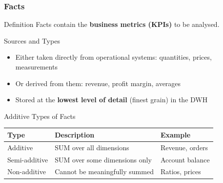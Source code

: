 \begin{frame}
  \frametitle{Facts}

  \begin{block}{Definition}
    Facts contain the \textbf{business metrics (KPIs)} to be analysed.
  \end{block}

  \begin{block}{Sources and Types}
    \begin{itemize}
      \item Either taken directly from operational systems:
        quantities, prices, measurements
      \item Or derived from them: revenue, profit margin, averages
      \item Stored at the \textbf{lowest level of detail} (finest grain)
        in the DWH
    \end{itemize}
  \end{block}

  \begin{block}{Additive Types of Facts}
    \begin{tabularx}{\linewidth}{@{}l X l@{}}
      \toprule
      \textbf{Type}     & \textbf{Description}                             & \textbf{Example} \\
      \midrule
      Additive          & SUM over all dimensions                          & Revenue, orders \\
      Semi-additive     & SUM over some dimensions only                    & Account balance \\
      Non-additive      & Cannot be meaningfully summed                    & Ratios, prices \\
      \bottomrule
    \end{tabularx}
  \end{block}
\end{frame}

